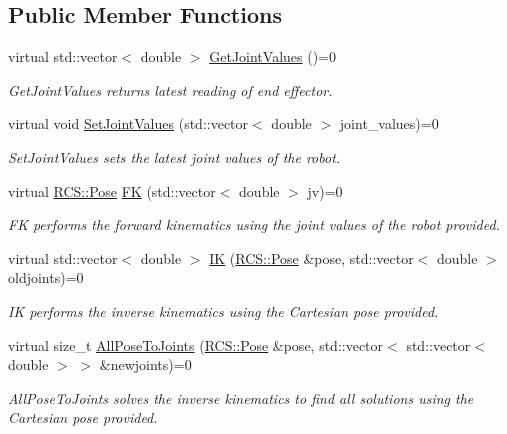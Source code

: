 \subsection*{Public Member Functions}
\begin{DoxyCompactItemize}
\item 
virtual std\-::vector$<$ double $>$ \hyperlink{classIKinematics_af41a85f8dc0cac9d94f982c7cf58b475}{Get\-Joint\-Values} ()=0
\begin{DoxyCompactList}\small\item\em Get\-Joint\-Values returns latest reading of end effector. \end{DoxyCompactList}\item 
virtual void \hyperlink{classIKinematics_ad43b2185f06e20eb0bf9d5a94d4aec18}{Set\-Joint\-Values} (std\-::vector$<$ double $>$ joint\-\_\-values)=0
\begin{DoxyCompactList}\small\item\em Set\-Joint\-Values sets the latest joint values of the robot. \end{DoxyCompactList}\item 
virtual \hyperlink{namespaceRCS_aa07e45d8a50e30064283d2b38087f999}{R\-C\-S\-::\-Pose} \hyperlink{classIKinematics_abf765053ac39fac5b94ef99e80b17f1b}{F\-K} (std\-::vector$<$ double $>$ jv)=0
\begin{DoxyCompactList}\small\item\em F\-K performs the forward kinematics using the joint values of the robot provided. \end{DoxyCompactList}\item 
virtual std\-::vector$<$ double $>$ \hyperlink{classIKinematics_ad0715c776a7eb325d2543bc34fa8114f}{I\-K} (\hyperlink{namespaceRCS_aa07e45d8a50e30064283d2b38087f999}{R\-C\-S\-::\-Pose} \&pose, std\-::vector$<$ double $>$ oldjoints)=0
\begin{DoxyCompactList}\small\item\em I\-K performs the inverse kinematics using the Cartesian pose provided. \end{DoxyCompactList}\item 
virtual size\-\_\-t \hyperlink{classIKinematics_aeb53bb4b2a1e70a79d5d724e5eb82c10}{All\-Pose\-To\-Joints} (\hyperlink{namespaceRCS_aa07e45d8a50e30064283d2b38087f999}{R\-C\-S\-::\-Pose} \&pose, std\-::vector$<$ std\-::vector$<$ double $>$ $>$ \&newjoints)=0
\begin{DoxyCompactList}\small\item\em All\-Pose\-To\-Joints solves the inverse kinematics to find all solutions using the Cartesian pose provided. \end{DoxyCompactList}\item 

\end{DoxyCompactItemize}
